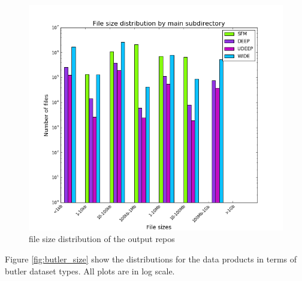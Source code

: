 \documentclass[DM,authoryear,toc]{lsstdoc}
\begin{document}
\begin{figure}[htbp]
        \begin{center}
                 \includegraphics[width=\textwidth]{figures/file_size_dist}
                 \caption{file size distribution of the output repos}
                 \label{fig:file_size_dist}
        \end{center}
\end{figure}

Figure \ref{fig:butler_size} show the distributions for the data products in terms of butler dataset types.  All plots are in log scale.
\end{document}
